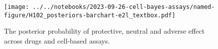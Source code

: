 \documentclass[letterpaper]{article}
\begin{document}
\begin{figure}[p]
\texttt{[image: ../../notebooks/2023-09-26-cell-bayes-assays/named-figure/H102\_posteriors-barchart-e2l\_textbox.pdf]}
\caption{The posterior probability of protective, neutral and adverse effect
  across drugs and cell-based assays.
}
\label{fig:bar-posterior-assays}
\end{figure}
\end{document}
